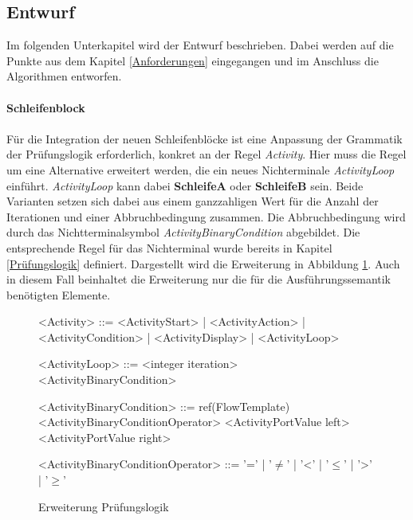 \documentclass{article}
\begin{document}
    \subsection{Entwurf}
    Im folgenden Unterkapitel wird der Entwurf beschrieben.
    Dabei werden auf die Punkte aus dem Kapitel \ref{Anforderungen} eingegangen und im Anschluss die Algorithmen entworfen.\\
    \\
    \textbf{Schleifenblock}\\
    \\
    Für die Integration der neuen Schleifenblöcke ist eine Anpassung der Grammatik der Prüfungslogik erforderlich, konkret an der Regel \textit{Activity}.    
    Hier muss die Regel um eine Alternative erweitert werden, die ein neues Nichterminale \textit{ActivityLoop} einführt.
    \textit{ActivityLoop} kann dabei \textbf{SchleifeA} oder \textbf{SchleifeB} sein.
    Beide Varianten setzen sich dabei aus einem ganzzahligen Wert für die Anzahl der Iterationen und einer Abbruchbedingung zusammen.
    Die Abbruchbedingung wird durch das Nichtterminalsymbol \textit{ActivityBinaryCondition} abgebildet.
    Die entsprechende Regel für das Nichterminal wurde bereits in Kapitel \ref{Prüfungslogik} definiert.
    Dargestellt wird die Erweiterung in Abbildung \ref{Erweiterung Prüfungslogik}.
    Auch in diesem Fall beinhaltet die Erweiterung nur die für die Ausführungssemantik benötigten Elemente.\\
    \begin{figure}[H]
        \begin{grammar}
            <Activity> ::= <ActivityStart>
            | <ActivityAction>
            | <ActivityCondition>
            | <ActivityDisplay>
            | <ActivityLoop>

            <ActivityLoop> ::= <integer iteration> <ActivityBinaryCondition>

            <ActivityBinaryCondition> ::= ref(FlowTemplate) <ActivityBinaryConditionOperator> <ActivityPortValue left> <ActivityPortValue right>

            <ActivityBinaryConditionOperator> ::= '='
            | '$\neq$' 
            | '\textless' 
            | '$\leq$' 
            | '\textgreater' 
            | '$\geq$'
        \end{grammar}
        \caption{Erweiterung Prüfungslogik}
        \label{Erweiterung Prüfungslogik}
    \end{figure}
\end{document}
